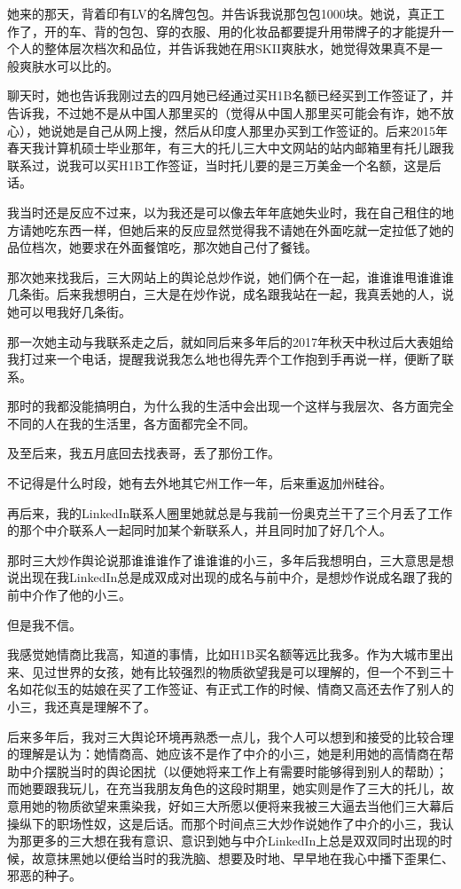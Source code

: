\documentclass[9pt, b5paper]{article}
\begin{document}
她来的那天，背着印有LV的名牌包包。并告诉我说那包包1000块。她说，真正工作了，开的车、背的包包、穿的衣服、用的化妆品都要提升用带牌子的才能提升一个人的整体层次档次和品位，并告诉我她在用SKII爽肤水，她觉得效果真不是一般爽肤水可以比的。

聊天时，她也告诉我刚过去的四月她已经通过买H1B名额已经买到工作签证了，并告诉我，不过她不是从中国人那里买的（觉得从中国人那里买可能会有诈，她不放心），她说她是自己从网上搜，然后从印度人那里办买到工作签证的。后来2015年春天我计算机硕士毕业那年，有三大的托儿三大中文网站的站内邮箱里有托儿跟我联系过，说我可以买H1B工作签证，当时托儿要的是三万美金一个名额，这是后话。 

我当时还是反应不过来，以为我还是可以像去年年底她失业时，我在自己租住的地方请她吃东西一样，但她后来的反应显然觉得我不请她在外面吃就一定拉低了她的品位档次，她要求在外面餐馆吃，那次她自己付了餐钱。 

那次她来找我后，三大网站上的舆论总炒作说，她们俩个在一起，谁谁谁甩谁谁谁几条街。后来我想明白，三大是在炒作说，成名跟我站在一起，我真丢她的人，说她可以甩我好几条街。

那一次她主动与我联系走之后，就如同后来多年后的2017年秋天中秋过后大表姐给我打过来一个电话，提醒我说我怎么地也得先弄个工作抱到手再说一样，便断了联系。

那时的我都没能搞明白，为什么我的生活中会出现一个这样与我层次、各方面完全不同的人在我的生活里，各方面都完全不同。 

及至后来，我五月底回去找表哥，丢了那份工作。

不记得是什么时段，她有去外地其它州工作一年，后来重返加州硅谷。 

再后来，我的LinkedIn联系人圈里她就总是与我前一份奥克兰干了三个月丢了工作的那个中介联系人一起同时加某个新联系人，并且同时加了好几个人。

那时三大炒作舆论说那谁谁谁作了谁谁谁的小三，多年后我想明白，三大意思是想说出现在我LinkedIn总是成双成对出现的成名与前中介，是想炒作说成名跟了我的前中介作了他的小三。 

但是我不信。

我感觉她情商比我高，知道的事情，比如H1B买名额等远比我多。作为大城市里出来、见过世界的女孩，她有比较强烈的物质欲望我是可以理解的，但一个不到三十名如花似玉的姑娘在买了工作签证、有正式工作的时候、情商又高还去作了别人的小三，我还真是理解不了。

后来多年后，我对三大舆论环境再熟悉一点儿，我个人可以想到和接受的比较合理的理解是认为：她情商高、她应该不是作了中介的小三，她是利用她的高情商在帮助中介摆脱当时的舆论困扰（以便她将来工作上有需要时能够得到别人的帮助）；而她要跟我玩儿，在充当我朋友角色的这段时期里，她实则是作了三大的托儿，故意用她的物质欲望来熏染我，好如三大所愿以便将来我被三大逼去当他们三大幕后操纵下的职场性奴，这是后话。而那个时间点三大炒作说她作了中介的小三，我认为那更多的三大想在我有意识、意识到她与中介LinkedIn上总是双双同时出现的时候，故意抹黑她以便给当时的我洗脑、想要及时地、早早地在我心中播下歪果仁、邪恶的种子。
\end{document}

